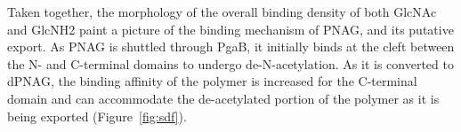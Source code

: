 Taken together, the morphology of the overall binding density of both GlcNAc and GlcNH2 paint a picture  of the binding mechanism of PNAG, and its putative export. As PNAG is shuttled through PgaB, it initially binds at the cleft between the N- and C-terminal domains to undergo de-N-acetylation.  As it is converted to dPNAG, the binding affinity of the polymer is increased for the C-terminal domain and can accommodate the de-acetylated portion of the polymer as it is being exported  (Figure~\ref{fig:sdf}).




